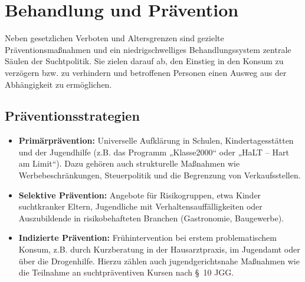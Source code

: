 \documentclass[11pt,a4paper]{article}
\begin{document}
	\section{Behandlung und Prävention}
	
	Neben gesetzlichen Verboten und Altersgrenzen sind gezielte Präventionsmaßnahmen und ein niedrigschwelliges Behandlungssystem zentrale Säulen der Suchtpolitik. Sie zielen darauf ab, den Einstieg in den Konsum zu verzögern bzw. zu verhindern und betroffenen Personen einen Ausweg aus der Abhängigkeit zu ermöglichen\cite{dhs-praevention}.
	
	\subsection{Präventionsstrategien}
	\begin{itemize}[leftmargin=*, noitemsep]
		\item \textbf{Primärprävention:} Universelle Aufklärung in Schulen, Kindertagesstätten und der Jugendhilfe (z.B. das Programm „Klasse2000“ oder „HaLT – Hart am Limit“). Dazu gehören auch strukturelle Maßnahmen wie Werbebeschränkungen, Steuerpolitik und die Begrenzung von Verkaufsstellen\cite{dhs-praevention}.
		\item \textbf{Selektive Prävention:} Angebote für Risikogruppen, etwa Kinder suchtkranker Eltern, Jugendliche mit Verhaltensauffälligkeiten oder Auszubildende in risikobehafteten Branchen (Gastronomie, Baugewerbe).
		\item \textbf{Indizierte Prävention:} Frühintervention bei erstem problematischem Konsum, z.B. durch Kurzberatung in der Hausarztpraxis, im Jugendamt oder über die Drogenhilfe. Hierzu zählen auch jugendgerichtsnahe Maßnahmen wie die Teilnahme an suchtpräventiven Kursen nach \S~10 JGG.
	\end{itemize}
	
\end{document}
